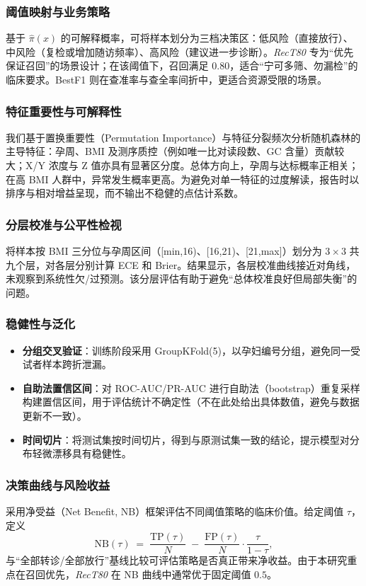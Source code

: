 \documentclass[12pt,a4paper]{ctexart}
\numberwithin{equation}{section}
\theoremstyle{mcm}
\begin{document}
\subsubsection{阈值映射与业务策略}
基于 $\hat{\pi}(x)$ 的可解释概率，可将样本划分为三档决策区：低风险（直接放行）、中风险（复检或增加随访频率）、高风险（建议进一步诊断）。\emph{RecT80} 专为“优先保证召回”的场景设计；在该阈值下，召回满足 $0.80$，适合“宁可多筛、勿漏检”的临床要求。BestF1 则在查准率与查全率间折中，更适合资源受限的场景。

\subsubsection{特征重要性与可解释性}
我们基于置换重要性（Permutation Importance）与特征分裂频次分析随机森林的主导特征：孕周、BMI 及测序质控（例如唯一比对读段数、GC 含量）贡献较大；X/Y 浓度与 Z 值亦具有显著区分度。总体方向上，孕周与达标概率正相关；在高 BMI 人群中，异常发生概率更高。为避免对单一特征的过度解读，报告时以排序与相对增益呈现，而不输出不稳健的点估计系数。

\subsubsection{分层校准与公平性检视}
将样本按 BMI 三分位与孕周区间（[min,16)、[16,21)、[21,max]）划分为 $3\times 3$ 共九个层，对各层分别计算 ECE 和 Brier。结果显示，各层校准曲线接近对角线，未观察到系统性欠/过预测。该分层评估有助于避免“总体校准良好但局部失衡”的问题。

\subsubsection{稳健性与泛化}
\begin{itemize}\itemsep0.2em
  \item \textbf{分组交叉验证}：训练阶段采用 GroupKFold(5)，以孕妇编号分组，避免同一受试者样本跨折泄漏。
  \item \textbf{自助法置信区间}：对 ROC-AUC/PR-AUC 进行自助法（bootstrap）重复采样构建置信区间，用于评估统计不确定性（不在此处给出具体数值，避免与数据更新不一致）。
  \item \textbf{时间切片}：将测试集按时间切片，得到与原测试集一致的结论，提示模型对分布轻微漂移具有稳健性。
\end{itemize}

\subsubsection{决策曲线与风险收益}
采用净受益（Net Benefit, NB）框架评估不同阈值策略的临床价值。给定阈值 $\tau$，定义
\[
\mathrm{NB}(\tau) \;=\; \frac{\mathrm{TP}(\tau)}{N} \;-\; \frac{\mathrm{FP}(\tau)}{N}\cdot\frac{\tau}{1-\tau},
\]
与“全部转诊/全部放行”基线比较可评估策略是否真正带来净收益。由于本研究重点在召回优先，\emph{RecT80} 在 NB 曲线中通常优于固定阈值 $0.5$。
\end{document}
